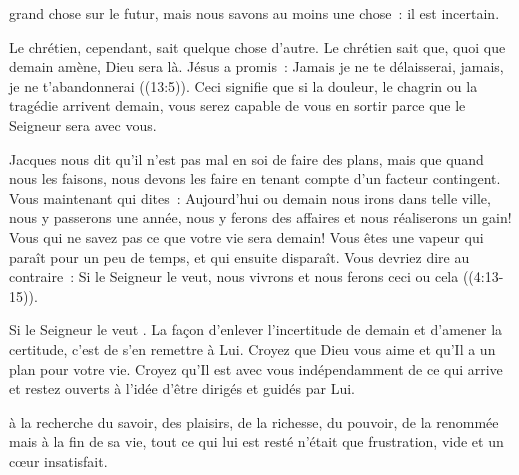 

 grand chose sur le futur,
 mais nous savons au moins une chose~: il est incertain. 

Le chrétien, cependant, sait quelque chose d'autre.
 Le chrétien sait que, quoi que demain amène, Dieu sera là.
 Jésus a promis~:
 \og Jamais je ne te délaisserai, jamais, je ne t'abandonnerai \fg{}
 ((13:5)).
 Ceci signifie que si la douleur, le chagrin ou la tragédie arrivent 
 demain, vous serez capable de vous en sortir
 parce que le Seigneur sera avec vous. 


Jacques nous dit qu'il n'est pas mal en soi de faire des plans,
 mais que quand nous les faisons, nous devons les faire en tenant compte
 d'un facteur contingent.
 \og Vous maintenant qui dites~: Aujourd'hui ou demain nous irons
 dans telle ville, nous y passerons une année, nous y ferons des affaires
 et nous réaliserons un gain! Vous qui ne savez pas ce que votre vie
 sera demain! Vous êtes une vapeur qui paraît pour un peu de temps,
 et qui ensuite disparaît.
 Vous devriez dire au contraire~: Si le Seigneur le veut,
 nous vivrons et nous ferons ceci ou cela \fg{} ((4:13-15)). 

\og Si le Seigneur le veut \fg{}. La façon d'enlever l'incertitude de demain
 et d'amener la certitude, c'est de s'en remettre à Lui.
 Croyez que Dieu vous aime et qu'Il a un plan pour votre vie.
 Croyez qu'Il est avec vous indépendamment de ce qui arrive
 \ocadr et restez ouverts à l'idée d'être dirigés et guidés par Lui.

\dvrule






 à la recherche du savoir, des plaisirs,
 de la richesse, du pouvoir, de la renommée
 \ocadr mais à la fin de sa vie, tout ce qui lui est resté
 n'était que frustration, vide et un cœur insatisfait. 

